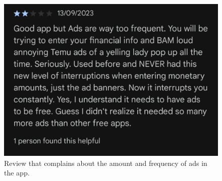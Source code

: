 \documentclass{l4proj}
\begin{document}
\begin{appendices}
\begin{figure}[H]
\end{figure}
\begin{figure}[H]
    \centering
    \includegraphics[width=0.5\linewidth]{images/App-Comparison/spending-tracker-review-7.png}
    \caption{Review that complains about the amount and frequency of ads in the app.}
    \label{fig:enter-label}
\end{figure}


\end{appendices}
\end{document}
